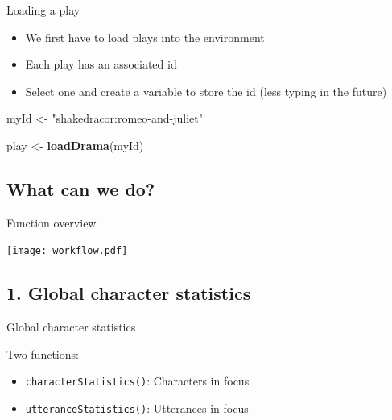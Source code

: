 \documentclass[ignorenonframetext,]{beamer}
\newenvironment{Shaded}{\begin{snugshade}}{\end{snugshade}}
\newcommand{\KeywordTok}[1]{\textcolor[rgb]{0.13,0.29,0.53}{\textbf{#1}}}
\newcommand{\NormalTok}[1]{#1}
\newcommand{\StringTok}[1]{\textcolor[rgb]{0.31,0.60,0.02}{#1}}
\providecommand{\tightlist}{%
  \setlength{\itemsep}{0pt}\setlength{\parskip}{0pt}}
\begin{document}
\begin{frame}[fragile]{Loading a play}
\protect\hypertarget{loading-a-play}{}

\begin{itemize}
\tightlist
\item
  We first have to load plays into the environment
\item
  Each play has an associated id
\item
  Select one and create a variable to store the id (less typing in the
  future)
\end{itemize}

\pause

\begin{Shaded}
\begin{Highlighting}[]
\NormalTok{myId <-}\StringTok{ "shakedracor:romeo-and-juliet"}

\NormalTok{play <-}\StringTok{ }\KeywordTok{loadDrama}\NormalTok{(myId)}
\end{Highlighting}
\end{Shaded}

\end{frame}

\hypertarget{what-can-we-do}{%
\subsection{What can we do?}\label{what-can-we-do}}

\begin{frame}{Function overview}
\protect\hypertarget{function-overview}{}

\texttt{[image: workflow.pdf]}

\end{frame}

\hypertarget{global-character-statistics}{%
\subsection{1. Global character
statistics}\label{global-character-statistics}}

\begin{frame}[fragile]{Global character statistics}
\protect\hypertarget{global-character-statistics-1}{}

Two functions:

\begin{itemize}
\tightlist
\item
  \texttt{characterStatistics()}: Characters in focus
\item
  \texttt{utteranceStatistics()}: Utterances in focus
\end{itemize}

\end{frame}
\end{document}
